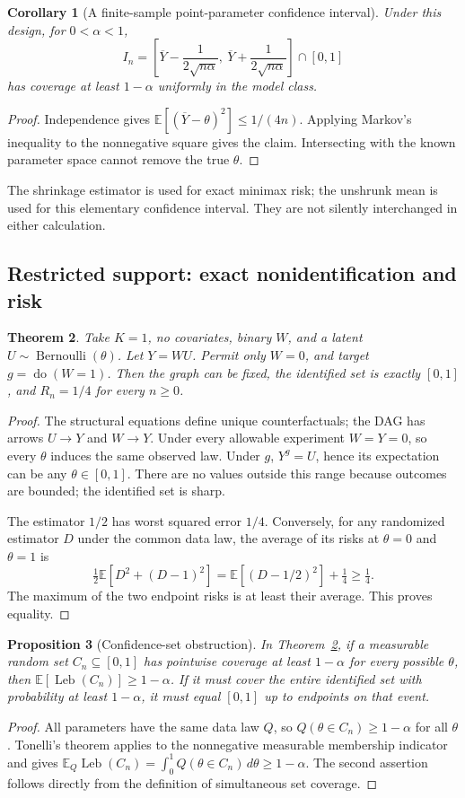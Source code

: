\documentclass[11pt,a4paper]{article}
\newtheorem{theorem}{Theorem}[section]
\newtheorem{proposition}[theorem]{Proposition}
\newtheorem{corollary}[theorem]{Corollary}
\theoremstyle{remark}\newtheorem{remark}[theorem]{Remark}
\newcommand{\E}{\mathbb E}
\begin{document}
\begin{corollary}[A finite-sample point-parameter confidence interval]
Under this design, for $0<\alpha<1$,
\[
I_n=\left[\overline Y-\frac1{2\sqrt{n\alpha}},\
\overline Y+\frac1{2\sqrt{n\alpha}}\right]\cap[0,1]
\]
has coverage at least $1-\alpha$ uniformly in the model class.
\end{corollary}
\begin{proof}
Independence gives $\E[(\overline Y-\theta)^2]\le1/(4n)$. Applying Markov's inequality to the nonnegative square gives the claim. Intersecting with the known parameter space cannot remove the true $\theta$.
\end{proof}
The shrinkage estimator is used for exact minimax risk; the unshrunk mean is used for this elementary confidence interval. They are not silently interchanged in either calculation.

\subsection{Restricted support: exact nonidentification and risk}
\begin{theorem}\label{thm:nonid}
Take $K=1$, no covariates, binary $W$, and a latent $U\sim\operatorname{Bernoulli}(\theta)$. Let $Y=WU$. Permit only $W=0$, and target $g=\operatorname{do}(W=1)$. Then the graph can be fixed, the identified set is exactly $[0,1]$, and $R_n=1/4$ for every $n\ge0$.
\end{theorem}
\begin{proof}
The structural equations define unique counterfactuals; the DAG has arrows $U\to Y$ and $W\to Y$. Under every allowable experiment $W=Y=0$, so every $\theta$ induces the same observed law. Under $g$, $Y^g=U$, hence its expectation can be any $\theta\in[0,1]$. There are no values outside this range because outcomes are bounded; the identified set is sharp.

The estimator $1/2$ has worst squared error $1/4$. Conversely, for any randomized estimator $D$ under the common data law, the average of its risks at $\theta=0$ and $\theta=1$ is
\[
\tfrac12\E[D^2+(D-1)^2]=\E[(D-1/2)^2]+\tfrac14\ge\tfrac14.
\]
The maximum of the two endpoint risks is at least their average. This proves equality.
\end{proof}

\begin{proposition}[Confidence-set obstruction]
In Theorem~\ref{thm:nonid}, if a measurable random set $C_n\subseteq[0,1]$ has pointwise coverage at least $1-\alpha$ for every possible $\theta$, then
$\E[\operatorname{Leb}(C_n)]\ge1-\alpha$. If it must cover the entire identified set with probability at least $1-\alpha$, it must equal $[0,1]$ up to endpoints on that event.
\end{proposition}
\begin{proof}
All parameters have the same data law $Q$, so $Q(\theta\in C_n)\ge1-\alpha$ for all $\theta$. Tonelli's theorem applies to the nonnegative measurable membership indicator and gives $\E_Q\operatorname{Leb}(C_n)=\int_0^1Q(\theta\in C_n)\,d\theta\ge1-\alpha$. The second assertion follows directly from the definition of simultaneous set coverage.
\end{proof}
\end{document}
